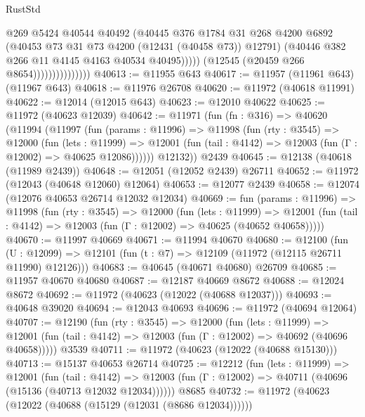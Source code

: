 \begin{lexlean}{RustStd}
\begin{coremodule}
                                    @269
                                    @5424
                                    @40544
                                    @40492
                                    (@40445
                                      @376
                                      @1784
                                      @31
                                      @268
                                      @4200
                                      @6892
                                      (@40453 @73 @31 @73 @4200 (@12431 (@40458 @73)) @12791)
                                      (@40446 @382 @266 @11 @4145 @4163 @40534 @40495)))))
                              (@12545 (@20459 @266 @8654)))))))))))))))
@40613 := @11955 @643
@40617 := @11957 (@11961 @643) (@11967 @643)
@40618 := @11976 @26708
@40620 := @11972 (@40618 @11991)
@40622 := @12014 (@12015 @643)
@40623 := @12010 @40622
@40625 := @11972 (@40623 @12039)
@40642 := @11971
    (fun (fn : @316) =>
    @40620
      (@11994
        (@11997
          (fun (params : @11996) =>
          @11998
            (fun (rty : @3545) =>
            @12000
              (fun (lets : @11999) =>
              @12001 (fun (tail : @4142) => @12003 (fun (Γ : @12002) => @40625 @12086))))))
        @12132))
    @2439
@40645 := @12138 (@40618 (@11989 @2439))
@40648 := @12051 (@12052 @2439) @26711
@40652 := @11972 (@12043 (@40648 @12060) @12064)
@40653 := @12077 @2439
@40658 := @12074 (@12076 @40653 @26714 @12032 @12034)
@40669 := fun (params : @11996) =>
  @11998
    (fun (rty : @3545) =>
    @12000
      (fun (lets : @11999) =>
      @12001 (fun (tail : @4142) => @12003 (fun (Γ : @12002) => @40625 (@40652 @40658)))))
@40670 := @11997 @40669
@40671 := @11994 @40670
@40680 := @12100
    (fun (U : @12099) => @12101 (fun (t : @7) => @12109 (@11972 (@12115 @26711 @11990) @12126)))
@40683 := @40645 (@40671 @40680) @26709
@40685 := @11957 @40670 @40680
@40687 := @12187 @40669 @8672
@40688 := @12024 @8672
@40692 := @11972 (@40623 (@12022 (@40688 @12037)))
@40693 := @40648 @39020
@40694 := @12043 @40693
@40696 := @11972 (@40694 @12064)
@40707 := @12190
    (fun (rty : @3545) =>
    @12000
      (fun (lets : @11999) =>
      @12001 (fun (tail : @4142) => @12003 (fun (Γ : @12002) => @40692 (@40696 @40658)))))
    @3539
@40711 := @11972 (@40623 (@12022 (@40688 @15130)))
@40713 := @15137 @40653 @26714
@40725 := @12212
    (fun (lets : @11999) =>
    @12001
      (fun (tail : @4142) =>
      @12003 (fun (Γ : @12002) => @40711 (@40696 (@15136 (@40713 @12032 @12034))))))
    @8685
@40732 := @11972 (@40623 (@12022 (@40688 (@15129 (@12031 (@8686 @12034))))))

\end{coremodule}
\end{lexlean}
